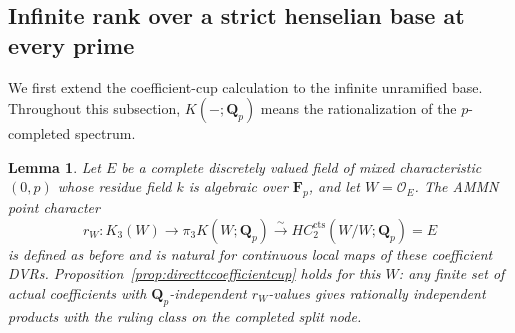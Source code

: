 \documentclass[11pt,a4paper]{article}
\newtheorem{lemma}[theorem]{Lemma}
\theoremstyle{remark}
\begin{document}
\subsection{Infinite rank over a strict henselian base at every prime}
\label{sec:directtcstrictallprimes}

We first extend the coefficient-cup calculation to the infinite
unramified base. Throughout this subsection, $K(-;\mathbf Q_p)$ means
the rationalization of the $p$-completed spectrum.

\begin{lemma}\label{lem:directtcperfectcoeffcup}
Let $E$ be a complete discretely valued field of mixed characteristic
$(0,p)$ whose residue field $k$ is algebraic over $\mathbf F_p$, and
let $W=\mathcal O_E$. The AMMN point character
\[
 r_W:K_3(W)\longrightarrow\pi_3K(W;\mathbf Q_p)
       \xrightarrow{\sim}HC_2^{\mathrm{cts}}(W/W;\mathbf Q_p)=E
\]
is defined as before and is natural for continuous local maps of
these coefficient DVRs. Proposition~\ref{prop:directtccoefficientcup}
holds for this $W$: any finite set of actual coefficients with
$\mathbf Q_p$-independent $r_W$-values gives rationally independent
products with the ruling class on the completed split node.
\end{lemma}
\end{document}
